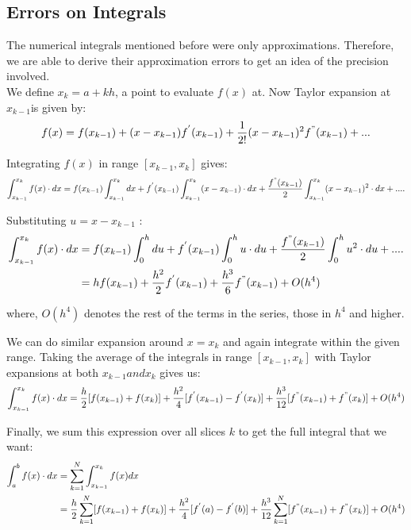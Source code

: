 \subsection{Errors on Integrals}
The numerical integrals mentioned before were only approximations. Therefore, we are able to derive their approximation errors to get an idea of the precision involved.\\

We define $x_{k}=a+kh$, a point to evaluate $f(x)$ at. Now Taylor expansion at $x_{k-1} $is given by:
\[ f(x)= f(x_{k-1})+(x-x_{k-1})f^{'}(x_{k-1})+\dfrac{1}{2!}(x-x_{k-1})^{2}f^{"}(x_{k-1}) + ... \]
\par Integrating $f(x)$ in range $[x_{k-1},x_{k}]$ gives:
\[ \int_{x_{k-1}}^{x_{k}}f(x)\cdot dx = f(x_{k-1})\int_{x_{k-1}}^{x_{k}}dx + f^{'}(x_{k-1})\int_{x_{k-1}}^{x_{k}}(x-x_{k-1})\cdot dx +\dfrac{f^{"}(x_{k-1})}{2}\int_{x_{k-1}}^{x_{k}}(x-x_{k-1})^{2}\cdot dx + ....
\]
\par Substituting $u=x-x_{k-1}$ :
\[ \begin{split}
\int_{x_{k-1}}^{x_k} f(x)\cdot dx&=f(x_{k-1})\int_{0}^{h}du+f^{'}(x_{k-1})\int_{0}^{h}u\cdot du + \dfrac{f^{"}(x_{k-1})}{2}\int_{0}^{h}u^{2}\cdot du+ ....\\
&=hf(x_{k-1})+\dfrac{h^{2}}{2}f^{'}(x_{k-1})+\dfrac{h^{3}}{6}f^{"}(x_{k-1})+O(h^{4})\\
\end{split} \]
\par where,  $O(h^{4})$ denotes the rest of the terms in the series, those in $h^{4}$ and higher.\\
\par We can do similar expansion around $x=x_{k}$ and again integrate within the given range. Taking the average of the integrals in range $[x_{k-1},x_{k}]$ with Taylor expansions at both $x_{k-1} and x_{k}$ gives us:
\[\int_{x_{k-1}}^{x_{k}}f(x)\cdot dx = \dfrac{h}{2}[f(x_{k-1})+f(x_k)]+\dfrac{h^2}{4}[f^{'}(x_{k-1})-f^{'}(x_k)]+\dfrac{h^3}{12}[f^{"}(x_{k-1})+f^{"}(x_k)]+O(h^4)
\]
\par Finally, we sum this expression over all slices $k$ to get the full integral that we want:
\[\begin{split}
\int_{a}^{b}f(x)\cdot dx& =\sum_{k=1}^{N}\int_{x_{k-1}}^{x_{k}}f(x)dx\\
&=\dfrac{h}{2}\sum_{k=1}^{N}[f(x_{k-1})+f(x_{k})]+\dfrac{h^{2}}{4}[f^{'}(a)-f^{'}(b)]+\dfrac{h^{3}}{12}\sum_{k=1}^{N}[f^{"}(x_{k-1})+f^{"}(x_{k})]+O(h^{4})\\
\end{split}
\]
